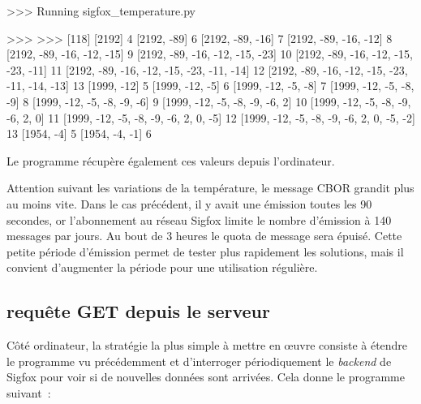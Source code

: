 \begin{termc}[backgroundcolor=\color{gray!10}, basicstyle=\ttfamily\tiny, escapechar=@]
>>> Running sigfox_temperature.py

>>>
>>>
[118]
[2192] 4
[2192, -89] 6
[2192, -89, -16] 7
[2192, -89, -16, -12] 8
[2192, -89, -16, -12, -15] 9
[2192, -89, -16, -12, -15, -23] 10
[2192, -89, -16, -12, -15, -23, -11] 11
[2192, -89, -16, -12, -15, -23, -11, -14] 12
[2192, -89, -16, -12, -15, -23, -11, -14, -13] 13
[1999, -12] 5
[1999, -12, -5] 6
[1999, -12, -5, -8] 7
[1999, -12, -5, -8, -9] 8
[1999, -12, -5, -8, -9, -6] 9
[1999, -12, -5, -8, -9, -6, 2] 10
[1999, -12, -5, -8, -9, -6, 2, 0] 11
[1999, -12, -5, -8, -9, -6, 2, 0, -5] 12
[1999, -12, -5, -8, -9, -6, 2, 0, -5, -2] 13
[1954, -4] 5
[1954, -4, -1] 6
\end{termc}

Le  programme  récupère également ces valeurs depuis l'ordinateur.


Attention suivant les variations de la température, le message CBOR grandit plus au moins vite. Dans le cas précédent, il y avait une émission toutes les 90 secondes, or l'abonnement au réseau Sigfox limite le nombre d'émission à 140 messages par jours. Au bout de 3 heures le quota de message sera épuisé. Cette petite période d'émission permet de tester plus rapidement les solutions, mais il convient d'augmenter la période pour une utilisation régulière.

\subsection{requête GET depuis le serveur}

Côté ordinateur, la stratégie la plus simple à mettre en œuvre consiste à étendre le programme  vu précédemment et d'interroger périodiquement le \textit{backend} de Sigfox pour voir si de nouvelles données sont arrivées. Cela donne le programme  suivant~:

